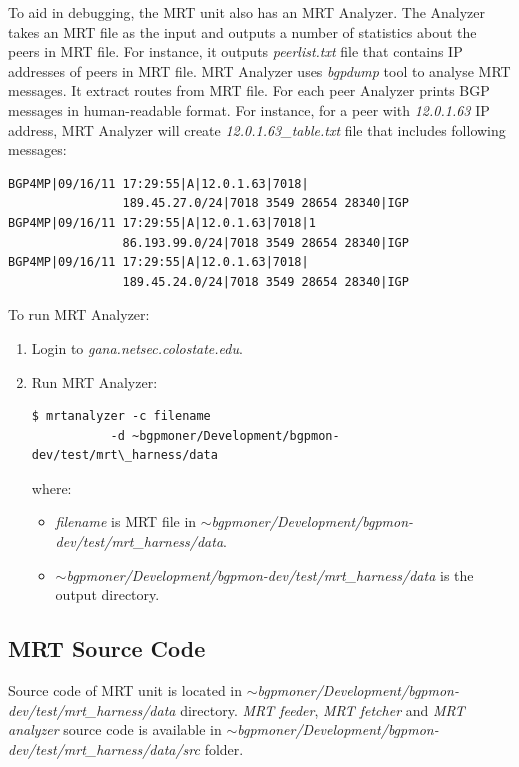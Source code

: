 To aid in debugging,  the MRT unit also has an MRT Analyzer.  The Analyzer takes an MRT file as the input and outputs a number of statistics about the peers in MRT file.  For instance, it outputs \emph{peerlist.txt} file that contains IP addresses of peers in MRT file. MRT Analyzer uses \emph{bgpdump} tool to analyse MRT messages. It extract routes from MRT file.  For each peer Analyzer prints BGP messages in human-readable format.   For instance, for a peer with  \emph{12.0.1.63} IP address, MRT Analyzer will create \emph{12.0.1.63\_table.txt} file that includes following messages:
\begin{verbatim}
BGP4MP|09/16/11 17:29:55|A|12.0.1.63|7018|
                189.45.27.0/24|7018 3549 28654 28340|IGP
BGP4MP|09/16/11 17:29:55|A|12.0.1.63|7018|1
                86.193.99.0/24|7018 3549 28654 28340|IGP
BGP4MP|09/16/11 17:29:55|A|12.0.1.63|7018|
                189.45.24.0/24|7018 3549 28654 28340|IGP
\end{verbatim}

To run MRT Analyzer:

\begin{enumerate}
\item{Login to \emph{gana.netsec.colostate.edu}.}
\item{Run MRT Analyzer:}
\begin{verbatim}
$ mrtanalyzer -c filename 
           -d ~bgpmoner/Development/bgpmon-dev/test/mrt\_harness/data
\end{verbatim}
  where:  
  \begin{itemize}
  \item{\emph{filename} is MRT file in \emph{$\sim$bgpmoner/Development/bgpmon-dev/test/mrt\_harness/data}. }
  \item{\emph{$\sim$bgpmoner/Development/bgpmon-dev/test/mrt\_harness/data} is the output directory.}
  \end{itemize}

\end{enumerate}




\subsection{MRT Source Code}
\label{sec:mrtsource}


Source code of MRT unit is located in \emph{$\sim$bgpmoner/Development/bgpmon-dev/test/mrt\_harness/data}  directory.  \emph{MRT feeder}, \emph{MRT fetcher} and \emph{MRT analyzer} source code is available in \emph{$\sim$bgpmoner/Development/bgpmon-dev/test/mrt\_harness/data/src} folder. 

